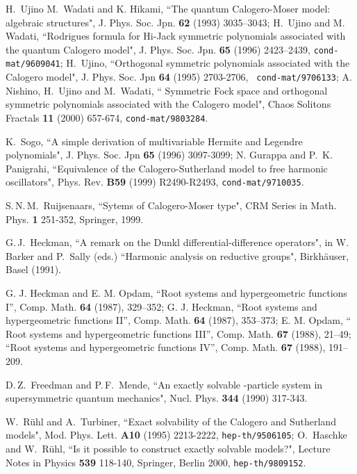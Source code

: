\documentclass[a4paper,12pt]{article}
\begin{document}
\begin{thebibliography}{99}
 H.\, Ujino  M.\, Wadati and K. Hikami, ``The quantum Calogero-Moser
model: algebraic structures", J. Phys. Soc. Jpn.
 {\bf 62} (1993) 3035--3043;
 H.\, Ujino and M.\, Wadati, ``Rodrigues formula for Hi-Jack symmetric
 polynomials associated with the quantum Calogero model", J. Phys. Soc.
Jpn. {\bf 65} (1996) 2423--2439, {\tt cond-mat/9609041};
  H.\, Ujino, ``Orthogonal symmetric polynomials associated with the
Calogero
  model",  J. Phys. Soc. Jpn {\bf 64}  (1995) 2703-2706, {\tt
cond-mat/9706133};   A.\, Nishino, H.\, Ujino and M.\, Wadati,
 `` Symmetric Fock space and orthogonal symmetric polynomials associated
 with the Calogero model",  Chaos Solitons Fractals {\bf 11}  (2000)
657-674, {\tt cond-mat/9803284}.


K.\, Sogo, ``A simple derivation of multivariable Hermite and
Legendre polynomials", J. Phys. Soc. Jpn {\bf 65}  (1996) 3097-3099;
N. Gurappa and P.\, K. Panigrahi,
``Equivalence of the Calogero-Sutherland model to free harmonic
oscillators", Phys. Rev. {\bf B59} (1999) R2490-R2493,
{\tt cond-mat/9710035}.

S.\,N.\,M.\, Ruijsenaars, ``Sytems of Calogero-Moser type",
CRM Series in Math. Phys. {\bf 1} 251-352, Springer, 1999.


G.\,J.\, Heckman, ``A remark on the Dunkl differential-difference
operators", in W.\, Barker and P.\, Sally (eds.) ``Harmonic analysis
on reductive groups", Birkh\"auser, Basel (1991).

 G. J. Heckman and E. M. Opdam, ``Root
systems and hypergeometric functions I'', Comp. Math. {\bf
64} (1987), 329--352;
G. J. Heckman, ``Root systems and
hypergeometric functions II'', Comp. Math. {\bf 64}
(1987), 353--373;
E. M. Opdam, `` Root systems and
hypergeometric functions III'', Comp. Math. {\bf 67}
(1988), 21--49;
``Root systems and
hypergeometric functions IV'', Comp.  Math. {\bf 67}
(1988), 191--209.



D.\,Z.\, Freedman and P.\,F.\, Mende, ``An exactly solvable \coordHE{}-particle
system
in supersymmetric quantum mechanics", Nucl. Phys. {\bf 344} (1990)
317-343.

W.\, R\"uhl and A.\, Turbiner, ``Exact solvability of the Calogero and
Sutherland models", Mod. Phys. Lett. {\bf A10} (1995) 2213-2222,
{\tt hep-th/9506105};
O.\, Haschke  and W.\, R\"uhl, ``Is it possible to construct exactly
solvable models?", Lecture Notes in Physics {\bf 539} 118-140,
Springer, Berlin 2000, {\tt hep-th/9809152}.


\end{thebibliography}
\end{document}

